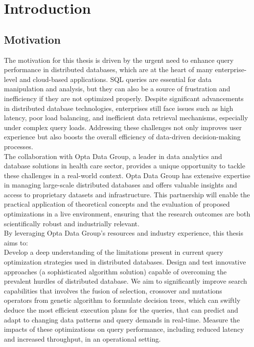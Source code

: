 \section{Introduction}
\subsection{Motivation} The motivation for this thesis is driven by the urgent need to enhance query performance in distributed databases, which are at the heart of many enterprise-level and cloud-based applications. SQL queries are essential for data manipulation and analysis, but they can also be a source of frustration and inefficiency if they are not optimized properly. Despite significant advancements in distributed database technologies, enterprises still face issues such as high latency, poor load balancing, and inefficient data retrieval mechanisms, especially under complex query loads. Addressing these challenges not only improves user experience but also boosts the overall efficiency of data-driven decision-making processes.\\
The collaboration with Opta Data Group, a leader in data analytics and database solutions in health care sector, provides a unique opportunity to tackle these challenges in a real-world context. Opta Data Group has extensive expertise in managing large-scale distributed databases and offers valuable insights and access to proprietary datasets and infrastructure. This partnership will enable the practical application of theoretical concepts and the evaluation of proposed optimizations in a live environment, ensuring that the research outcomes are both scientifically robust and industrially relevant.\\
By leveraging Opta Data Group's resources and industry experience, this thesis aims to:\\
Develop a deep understanding of the limitations present in current query optimization strategies used in distributed databases. Design and test innovative approaches (a sophisticated algorithm solution) capable of overcoming the prevalent hurdles of distributed database. We aim to significantly improve search capabilities that involves the fusion of selection, crossover and mutations operators from genetic algorithm to formulate decision trees, which can swiftly deduce the most efficient execution plans for the queries, that can predict and adapt to changing data patterns and query demands in real-time. Measure the impacts of these optimizations on query performance, including reduced latency and increased throughput, in an operational setting.\\

